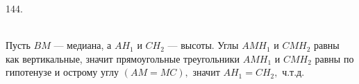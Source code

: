 144. \begin{figure}[ht!]
\end{figure}\\
Пусть $BM$ --- медиана, а $AH_1$ и $CH_2$ --- высоты. Углы $AMH_1$ и $CMH_2$ равны как вертикальные, значит прямоугольные треугольники $AMH_1$ и $CMH_2$ равны по гипотенузе и острому углу $(AM=MC),$ значит $AH_1=CH_2,$ ч.т.д.\\
